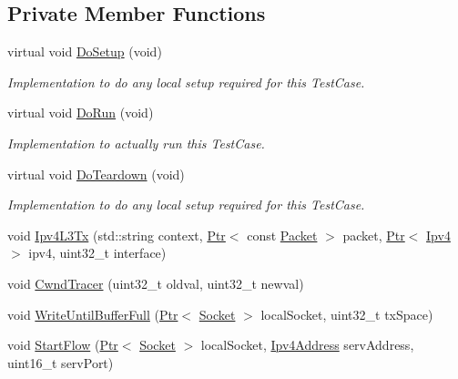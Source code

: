 \subsection*{Private Member Functions}
\begin{DoxyCompactItemize}
\item 
virtual void \hyperlink{classNs3TcpLossTestCase_a08237ed89cdb33439db0d70432dc773a}{Do\+Setup} (void)
\begin{DoxyCompactList}\small\item\em Implementation to do any local setup required for this Test\+Case. \end{DoxyCompactList}\item 
virtual void \hyperlink{classNs3TcpLossTestCase_aa6494c8b5df42627efd9625374b2eeeb}{Do\+Run} (void)
\begin{DoxyCompactList}\small\item\em Implementation to actually run this Test\+Case. \end{DoxyCompactList}\item 
virtual void \hyperlink{classNs3TcpLossTestCase_aec944c7c89b90381e63893e48ae3fd49}{Do\+Teardown} (void)
\begin{DoxyCompactList}\small\item\em Implementation to do any local setup required for this Test\+Case. \end{DoxyCompactList}\item 
void \hyperlink{classNs3TcpLossTestCase_ae9d29d3511ccbdbd60805872294ae8ce}{Ipv4\+L3\+Tx} (std\+::string context, \hyperlink{classns3_1_1Ptr}{Ptr}$<$ const \hyperlink{classns3_1_1Packet}{Packet} $>$ packet, \hyperlink{classns3_1_1Ptr}{Ptr}$<$ \hyperlink{classns3_1_1Ipv4}{Ipv4} $>$ ipv4, uint32\+\_\+t interface)
\item 
void \hyperlink{classNs3TcpLossTestCase_a00c3bb7a787ad770c7d7c10c9e7ad660}{Cwnd\+Tracer} (uint32\+\_\+t oldval, uint32\+\_\+t newval)
\item 
void \hyperlink{classNs3TcpLossTestCase_ad1c2e8c2cf5e35baa4d8860c9d941af8}{Write\+Until\+Buffer\+Full} (\hyperlink{classns3_1_1Ptr}{Ptr}$<$ \hyperlink{classns3_1_1Socket}{Socket} $>$ local\+Socket, uint32\+\_\+t tx\+Space)
\item 
void \hyperlink{classNs3TcpLossTestCase_a4a1869d1f22376be8825bab6cb172e30}{Start\+Flow} (\hyperlink{classns3_1_1Ptr}{Ptr}$<$ \hyperlink{classns3_1_1Socket}{Socket} $>$ local\+Socket, \hyperlink{classns3_1_1Ipv4Address}{Ipv4\+Address} serv\+Address, uint16\+\_\+t serv\+Port)
\end{DoxyCompactItemize}
